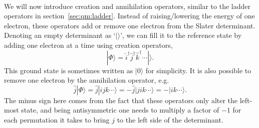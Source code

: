 \paragraph*{}
We will now introduce creation and annihilation operators, similar to the ladder operators in section~\ref{sec:qm:ladder}.
Instead of raising/lowering the energy of one electron, these operators add or remove one electron from the Slater determinant.
Denoting an empty determinant as `$|\rangle$', we can fill it to the reference state by adding one electron at a time using creation operators,
\begin{equation}
|\Phi \rangle = \hat{i}^{\dagger}\hat{j}^{\dagger}\hat{k}^{\dagger} \cdots |\rangle .
\end{equation}
This ground state is sometimes written as $| 0 \rangle$ for simplicity.
It is also possible to remove one electron by the annihilation operator, e.g.
\begin{equation}
\hat{j} | \Phi \rangle = 
\hat{j} | ijk\cdots \rangle = 
- \hat{j} | jik\cdots \rangle =
- | ik\cdots \rangle .
\end{equation}
The minus sign here comes from the fact that these operators only alter the left-most state, and being antisymmetric one needs to multiply a factor of $-1$ for each permutation it takes to bring $j$ to the left side of the determinant.

